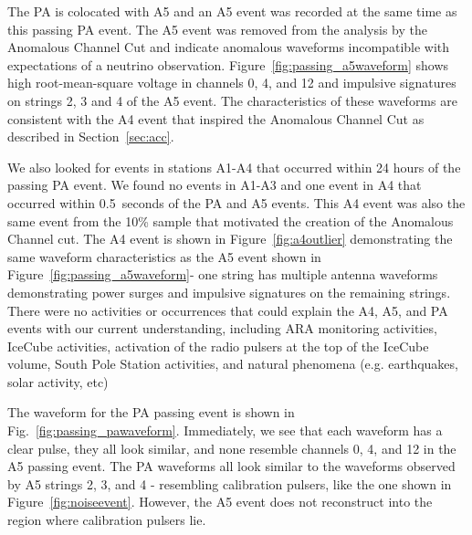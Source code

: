       The PA is colocated with A5 and an A5 event was recorded at the same time as this passing PA event.
      The A5 event was removed from the analysis by the Anomalous Channel Cut and indicate anomalous waveforms incompatible with expectations of a neutrino observation.
      Figure~\ref{fig:passing_a5waveform} shows high root-mean-square voltage in channels 0, 4, and 12 and impulsive signatures on strings 2, 3 and 4 of the A5 event. 
      The characteristics of these waveforms are consistent with the A4 event that inspired the Anomalous Channel Cut as described in Section~\ref{sec:acc}.

      We also looked for events in stations A1-A4 that occurred within 24 hours of the passing PA event. 
      We found no events in A1-A3 and one event in A4 that occurred within 0.5~seconds of the PA and A5 events. 
      This A4 event was also the same event from the 10\% sample that motivated the creation of the Anomalous Channel cut. 
      The A4 event is shown in Figure~\ref{fig:a4outlier} demonstrating the same waveform characteristics as the A5 event shown in Figure~\ref{fig:passing_a5waveform}- one string has multiple antenna waveforms demonstrating power surges and impulsive signatures on the remaining strings.
      There were no activities or occurrences that could explain the A4, A5, and PA events with our current understanding, including ARA monitoring activities, IceCube activities, activation of the radio pulsers at the top of the IceCube volume, South Pole Station activities, and natural phenomena (e.g. earthquakes, solar activity, etc)

      The waveform for the PA passing event is shown in Fig.~\ref{fig:passing_pawaveform}. 
      Immediately, we see that each waveform has a clear pulse, they all look similar, and none resemble channels 0, 4, and 12 in the A5 passing event.
      The PA waveforms all look similar to the waveforms observed by A5 strings 2, 3, and 4 - resembling calibration pulsers, like the one shown in Figure~\ref{fig:noiseevent}. 
      However, the A5 event does not reconstruct into the region where calibration pulsers lie.

